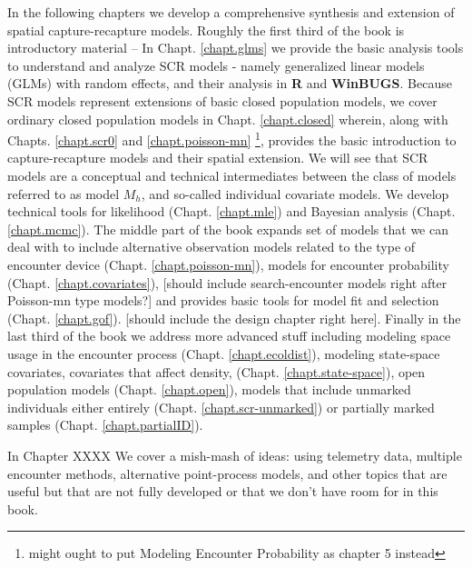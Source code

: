 In the following chapters we develop a comprehensive synthesis and extension of 
spatial capture-recapture models.
Roughly the first third of the book is introductory material -- 
In Chapt. \ref{chapt.glms} we provide the basic analysis tools to understand and
analyze SCR models - namely generalized linear models (GLMs) with random effects, and their
analysis in {\bf R} and {\bf WinBUGS}.  Because SCR models represent extensions of
basic closed population models, we cover ordinary closed population
models in Chapt. \ref{chapt.closed} wherein, along with Chapts. \ref{chapt.scr0} and \ref{chapt.poisson-mn}
\footnote{might ought to put Modeling Encounter Probability 
as chapter 5 instead}, provides the basic introduction 
to capture-recapture models and their spatial extension.
We will see that
SCR models are a 
conceptual and technical intermediates between the class of models referred to as 
model $M_h$, and so-called
individual covariate models.  
We develop technical tools for likelihood (Chapt. \ref{chapt.mle})
and Bayesian analysis (Chapt. \ref{chapt.mcmc}).
The middle part of the book expands set of models that we can deal with to include alternative
observation models related to the type of encounter device (Chapt. \ref{chapt.poisson-mn}), models for encounter probability
(Chapt. \ref{chapt.covariates}), [should include search-encounter models right after Poisson-mn type models?] and provides basic tools for model fit and selection (Chapt. \ref{chapt.gof}).
[should include the design chapter right here].
Finally in the last third of the book we address more advanced stuff including modeling
space usage in the encounter process (Chapt. \ref{chapt.ecoldist}), modeling state-space covariates, covariates
that affect density, (Chapt. \ref{chapt.state-space}), open population models (Chapt. \ref{chapt.open}),
models that include unmarked individuals either entirely (Chapt. \ref{chapt.scr-unmarked}) 
or partially marked samples (Chapt. \ref{chapt.partialID}).

In Chapter XXXX We cover a mish-mash of ideas: using telemetry data, multiple encounter methods, alternative
point-process models, and other topics that are useful but that are not fully developed or that we don't have
room for in this book. 





